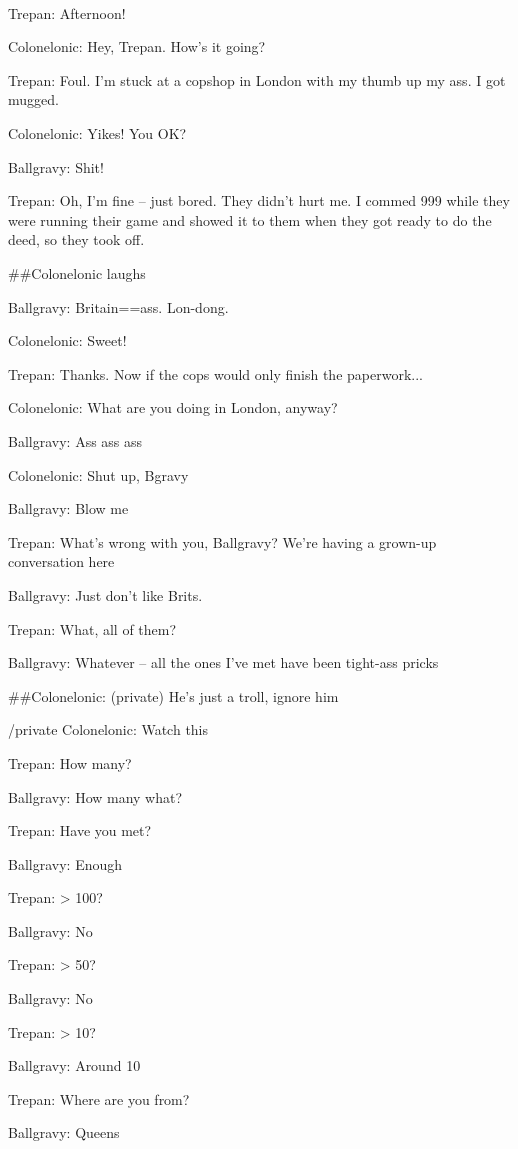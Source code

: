 {\raggedright
\tt
\addtolength{\parskip}{0.5\baselineskip}

Trepan: Afternoon!

Colonelonic: Hey, Trepan. How's it going?

Trepan: Foul. I'm stuck at a copshop in London with my thumb up my
ass. I got mugged.

Colonelonic: Yikes! You OK?

Ballgravy: Shit!

Trepan: Oh, I'm fine -- just bored. They didn't hurt me. I commed
999 while they were running their game and showed it to them when
they got ready to do the deed, so they took off.

\#\#Colonelonic laughs

Ballgravy: Britain==ass. Lon-dong.

Colonelonic: Sweet!

Trepan: Thanks. Now if the cops would only finish the paperwork...

Colonelonic: What are you doing in London, anyway?

Ballgravy: Ass ass ass

Colonelonic: Shut up, Bgravy

Ballgravy: Blow me

Trepan: What's wrong with you, Ballgravy? We're having a grown-up
conversation here

Ballgravy: Just don't like Brits.

Trepan: What, all of them?

Ballgravy: Whatever -- all the ones I've met have been tight-ass
pricks

\#\#Colonelonic: (private) He's just a troll, ignore him

/private Colonelonic: Watch this

Trepan: How many?

Ballgravy: How many what?

Trepan: Have you met?

Ballgravy: Enough

Trepan: \textgreater{} 100?

Ballgravy: No

Trepan: \textgreater{} 50?

Ballgravy: No

Trepan: \textgreater{} 10?

Ballgravy: Around 10

Trepan: Where are you from?

Ballgravy: Queens

}
